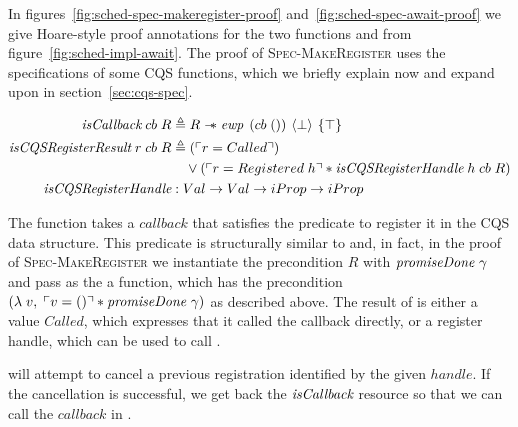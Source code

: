 In figures~\ref{fig:sched-spec-makeregister-proof} and~\ref{fig:sched-spec-await-proof} we give Hoare-style proof annotations for the two functions  and  from figure~\ref{fig:sched-impl-await}.
The proof of \textsc{Spec-MakeRegister} uses the specifications of some CQS functions, which we briefly explain now and expand upon in section~\ref{sec:cqs-spec}.

\begin{align*}
  \gsIsCb{}\; cb\; R                        & \triangleq R \wand \ewp{cb\; ()}{\bot}{\top}                                                       \\
  \textit{isCQSRegisterResult}\; r\; cb\; R & \triangleq (\ulcorner r = Called \urcorner)                                                        \\
                                            & \quad \vee (\ulcorner r = Registered\; h \urcorner \ast \textit{isCQSRegisterHandle}\; h\; cb\; R) \\
  \textit{isCQSRegisterHandle}              & : Val \to Val \to iProp \to iProp
\end{align*}


The function  takes a \(callback\) that satisfies the \gsIsCb{} predicate to register it in the CQS data structure.
This predicate is structurally similar to \gsIsWaker{} and, in fact, in the proof of \textsc{Spec-MakeRegister} we instantiate the precondition \(R\) with \(\textit{promiseDone}~\gamma{}\) and pass as the  a  function, which has the precondition \((\lambda\; v,\; \ulcorner v = () \urcorner \ast \textit{promiseDone}~\gamma{})\) as described above.
The result of  is either a value \(Called\), which expresses that it called the callback directly, or a register handle, which can be used to call .

 will attempt to cancel a previous registration identified by the given \(handle\).
If the cancellation is successful, we get back the \(\textit{isCallback}{}\) resource so that we can call the \(callback\) in .

